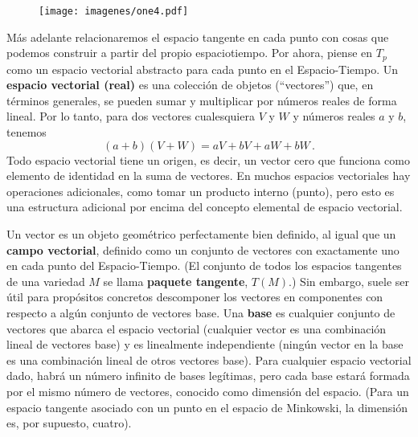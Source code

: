 \documentclass[11pt,b5paper,openany,twoside]{book}
\begin{document}
\begin{figure}[h]
\centering
\texttt{[image: imagenes/one4.pdf]}
\end{figure}

Más adelante relacionaremos el espacio tangente en cada punto con cosas que podemos construir a partir del propio espaciotiempo.
Por ahora, piense en $T_p$ como un espacio vectorial abstracto para cada punto en el Espacio-Tiempo.
Un {\bf espacio vectorial (real)} es una colección de objetos (``vectores'') que, en términos generales, se pueden sumar y multiplicar por números reales de forma lineal.
Por lo tanto, para dos vectores cualesquiera $V$ y $W$ y números reales $a$ y $b$, tenemos
\begin{equation}
(a+b)(V+W) = aV+bV+aW+bW\,.\label{1.22}
\end{equation}
Todo espacio vectorial tiene un origen, es decir, un vector cero que funciona como elemento de identidad en la suma de vectores.
En muchos espacios vectoriales hay operaciones adicionales, como tomar un producto interno (punto), pero esto es una estructura adicional por encima del concepto elemental de espacio vectorial.

Un vector es un objeto geométrico perfectamente bien definido, al igual que un {\bf campo vectorial}, definido como un conjunto de vectores con exactamente uno en cada punto del Espacio-Tiempo.
(El conjunto de todos los espacios tangentes de una variedad $M$ se llama {\bf paquete tangente}, $T(M)$.)
Sin embargo, suele ser útil para propósitos concretos descomponer los vectores en componentes con respecto a algún conjunto de vectores base.
Una {\bf base} es cualquier conjunto de vectores que abarca el espacio vectorial (cualquier vector es una combinación lineal de vectores base) y es linealmente independiente (ningún vector en la base es una combinación lineal de otros vectores base).
Para cualquier espacio vectorial dado, habrá un número infinito de bases legítimas, pero cada base estará formada por el mismo número de vectores, conocido como dimensión del espacio.
(Para un espacio tangente asociado con un punto en el espacio de Minkowski, la dimensión es, por supuesto, cuatro).
\end{document}
